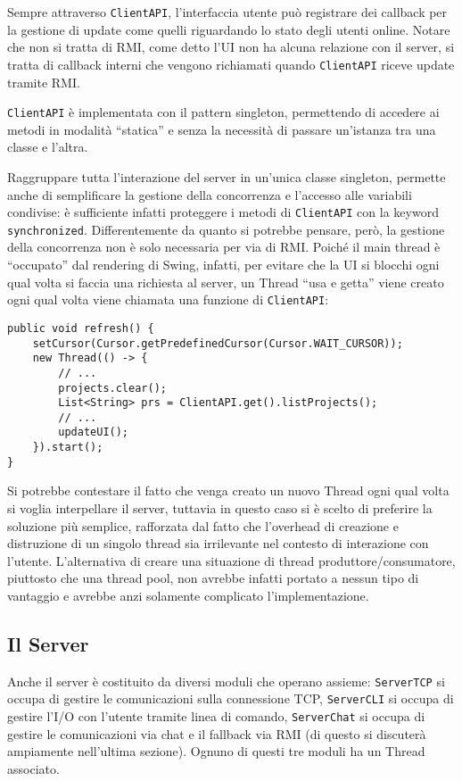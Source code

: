 \documentclass[a4paper,11pt] {article}
\begin{document}
Sempre attraverso \texttt{ClientAPI}, l'interfaccia utente può registrare dei callback per la gestione di update come quelli riguardando lo stato degli utenti online. Notare che non si tratta di RMI, come detto l'UI non ha alcuna relazione con il server, si tratta di callback interni che vengono richiamati quando \texttt{ClientAPI} riceve update tramite RMI.

\texttt{ClientAPI} è implementata con il pattern singleton, permettendo di accedere ai metodi in modalità ``statica'' e senza la necessità di passare un'istanza tra una classe e l'altra.

Raggruppare tutta l'interazione del server in un'unica classe singleton, permette anche di semplificare la gestione della concorrenza e l'accesso alle variabili condivise: è sufficiente infatti proteggere i metodi di \texttt{ClientAPI} con la keyword \texttt{synchronized}. Differentemente da quanto si potrebbe pensare, però, la gestione della concorrenza non è solo necessaria per via di RMI. Poiché il main thread è ``occupato'' dal rendering di Swing, infatti, per evitare che la UI si blocchi ogni qual volta si faccia una richiesta al server, un Thread ``usa e getta'' viene creato ogni qual volta viene chiamata una funzione di \texttt{ClientAPI}:

\begin{verbatim}
public void refresh() {
	setCursor(Cursor.getPredefinedCursor(Cursor.WAIT_CURSOR));
	new Thread(() -> {
		// ...
		projects.clear();
		List<String> prs = ClientAPI.get().listProjects();
		// ...
		updateUI();
	}).start();
}
\end{verbatim}
Si potrebbe contestare il fatto che venga creato un nuovo Thread ogni qual volta si voglia interpellare il server, tuttavia in questo caso si è scelto di preferire la soluzione più semplice, rafforzata dal fatto che l'overhead di creazione e distruzione di un singolo thread sia irrilevante nel contesto di interazione con l'utente. L'alternativa di creare una situazione di thread produttore/consumatore, piuttosto che una thread pool, non avrebbe infatti portato a nessun tipo di vantaggio e avrebbe anzi solamente complicato l'implementazione.

\subsection*{Il Server}

Anche il server è costituito da diversi moduli che operano assieme: \texttt{ServerTCP} si occupa di gestire le comunicazioni sulla connessione TCP, \texttt{ServerCLI} si occupa di gestire l'I/O con l'utente tramite linea di comando, \texttt{ServerChat} si occupa di gestire le comunicazioni via chat e il fallback via RMI (di questo si discuterà ampiamente nell'ultima sezione). Ognuno di questi tre moduli ha un Thread associato.
\end{document}

